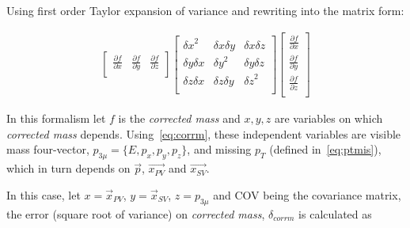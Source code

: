 Using first order Taylor expansion of variance and rewriting into the matrix form:

\begin{equation}
\begin{aligned}
       \begin{bmatrix}
		\frac{\partial{f}}{\partial{x}} & \frac{\partial{f}}{\partial{y}} & \frac{\partial{f}}{\partial{z}} \\
       \end{bmatrix}
       \begin{bmatrix}
	       {\delta x}^{2} & \delta x \delta y & \delta x \delta z  \\ 
	        \delta y \delta x & {\delta y}^{2} & \delta y \delta z  \\
	        \delta z \delta x & \delta z \delta y & {\delta z}^{2}  \\
       \end{bmatrix}
       \begin{bmatrix}
		\frac{\partial{f}}{\partial{x}} \\ \frac{\partial{f}}{\partial{y}} \\\frac{\partial{f}}{\partial{z}} \\
       \end{bmatrix}
\end{aligned}
\end{equation}

In this formalism let $f$ is the \emph{corrected mass} and $x,y,z$ are variables on which \emph{corrected mass} depends. Using~\autoref{eq:corrm}, these independent variables are visible mass four-vector, $p_{3\mu}=\{E,p_{x},p_{y},p_{z}\}$, and missing $p_{T}$ (defined in~\autoref{eq:ptmis}), which in turn depends on $\vec{p}$, $\vec{x_{PV}}$ and $\vec{x_{SV}}$.

In this case, let $x=\vec{{x}}_{PV}$, $y=\vec{{x}}_{SV}$, $z=p_{3\mu}$ and \rm{COV} being the covariance matrix, the error (square root of variance) on \emph{corrected mass}, $\delta_{corrm}$ is calculated as
%
%


